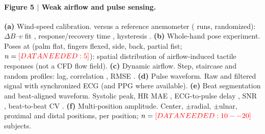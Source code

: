 \paragraph{Figure 5 $\vert$ Weak airflow and pulse sensing.}
\textbf{(a)} Wind-speed calibration.  versus a
reference anemometer ( runs, randomized): $\Delta B$--$v$ fit
, response/recovery time , hysteresis
\dataneeded{\%}. \textbf{(b)} Whole-hand pose experiment. Poses at
 (palm flat, fingers flexed, side, back,
partial fist; $n=\textcolor{red}{[DATA NEEDED: 5]}$): spatial distribution of airflow-induced
tactile responses (not a CFD flow field). \textbf{(c)} Dynamic airflow.
Step, staircase and random profiles: lag, correlation ,
RMSE . \textbf{(d)} Pulse waveform. Raw and filtered
signal with synchronized ECG (and PPG where available).
\textbf{(e)} Beat segmentation and beat-aligned waveform. Systolic peak,
HR MAE , ECG-to-pulse delay , SNR
, beat-to-beat CV \dataneeded{\%}. \textbf{(f)}
Multi-position amplitude. Center, $\pm$radial, $\pm$ulnar, proximal and
distal positions,  per position;
$n=\textcolor{red}{[DATA NEEDED: 10--20]}$ subjects.
